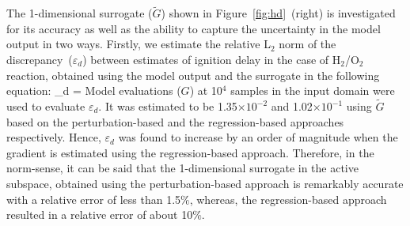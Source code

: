 The 1-dimensional surrogate ($\tilde{G}$) shown in Figure~\ref{fig:hd}~(right) is investigated
for its accuracy as well as the ability to capture the uncertainty in the
model output in two ways. Firstly, we estimate the relative L$_2$ norm of the discrepancy~($\varepsilon_d$)
between estimates of ignition delay in the case of H$_2$/O$_2$ reaction, obtained using the 
model output and the surrogate in the following equation:
%
\be
\varepsilon_d = 
\ee
%
Model evaluations ($G$) at 10$^{4}$ samples in the input domain were used to evaluate $\varepsilon_d$. 
It was estimated to be 1.35$\times10^{-2}$ and 1.02$\times10^{-1}$
using $\tilde{G}$ based on the perturbation-based and the regression-based approaches respectively. Hence,
$\varepsilon_d$ was found to increase by an order of magnitude when the gradient is estimated using
the regression-based approach.
Therefore, in the norm-sense, it can be said that the 1-dimensional surrogate in the active subspace, obtained
using the perturbation-based approach is remarkably accurate with a relative error of less than 1.5$\%$, whereas,
the regression-based approach resulted in a relative error of about 10$\%$.

